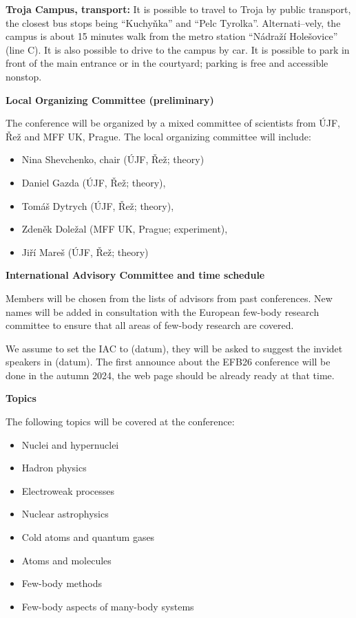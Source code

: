 \documentclass{article}[14pt]
\begin{document}
{\bf Troja Campus, transport:} It is possible to travel to Troja by public transport, the closest bus stops being “Kuchyňka”
and “Pelc Tyrolka”. Alternati--vely, the campus is about 15 minutes walk from the metro station “Nádraží Holešovice”
(line C). It is also possible to drive to the campus by car. It is possible to park in front of the main entrance or in the courtyard;
parking is free and accessible nonstop.


\begin{center}
{\bf \large Local Organizing Committee (preliminary)}
\end{center}

The conference will be organized by a mixed committee of scientists from ÚJF, Řež and MFF UK, Prague.
The local organizing committee will include:
\begin{itemize}
\item Nina Shevchenko, chair (ÚJF, Řež; theory) \\
\item Daniel Gazda (ÚJF, Řež; theory), \\
\item Tomáš Dytrych (ÚJF, Řež; theory), \\
\item Zdeněk Doležal (MFF UK, Prague; experiment), \\
\item Jiří Mareš (ÚJF, Řež; theory) 
\end{itemize}

\begin{center}
{\bf \large International Advisory Committee and time schedule}
\end{center}

Members will be chosen from the lists of advisors from past conferences. New names
will be added in consultation with the European few-body research committee to ensure that all
areas of few-body research are covered. 

We assume to set the IAC to (datum), they will be asked to suggest the invidet speakers in (datum). 
The first announce about the EFB26 conference will be done in the autumn 2024, the web page
should be already ready at that time.

\begin{center}
{\bf \large Topics}
\end{center}

The following topics will be covered at the conference:
\begin{itemize}
\item Nuclei and hypernuclei
\item  Hadron physics
\item  Electroweak processes
\item  Nuclear astrophysics
\item  Cold atoms and quantum gases
\item  Atoms and molecules
\item  Few-body methods
\item  Few-body aspects of many-body systems
\end{itemize}
\end{document}
